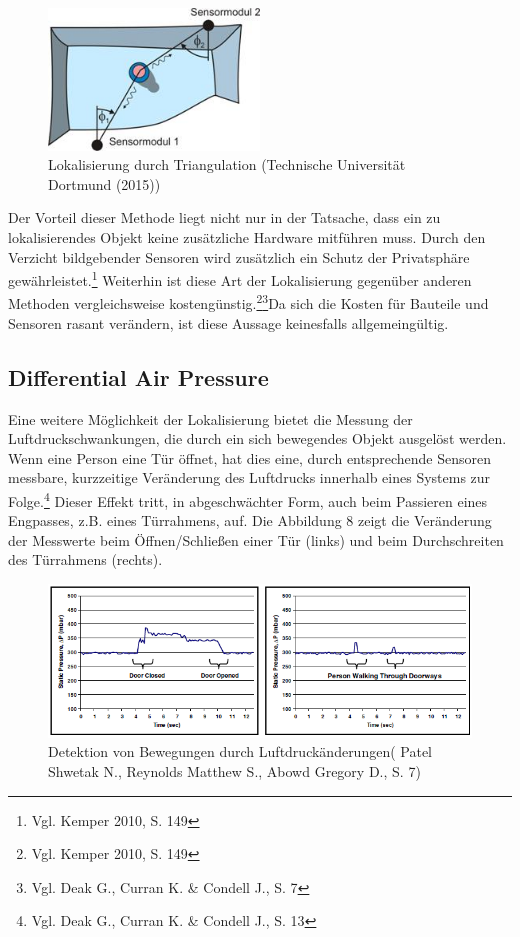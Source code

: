 \begin{figure}[H]
	\centering
	\includegraphics[width=0.5\textwidth]{pictures/triangulation}
	\caption{Lokalisierung durch Triangulation (Technische Universität Dortmund (2015))}
\end{figure}

Der Vorteil dieser Methode liegt nicht nur in der Tatsache, dass ein zu lokalisierendes Objekt keine zusätzliche Hardware mitführen muss. Durch den Verzicht bildgebender Sensoren wird zusätzlich ein Schutz der Privatsphäre gewährleistet.\footnote{Vgl. Kemper 2010, S. 149} Weiterhin ist diese Art der Lokalisierung gegenüber anderen Methoden vergleichsweise kostengünstig.\footnote{Vgl. Kemper 2010, S. 149}\footnote{Vgl. Deak G., Curran K. \& Condell J., S. 7}Da sich die Kosten für Bauteile und Sensoren rasant verändern, ist diese Aussage keinesfalls allgemeingültig. 

\subsection{Differential Air Pressure}
Eine weitere Möglichkeit der Lokalisierung bietet die Messung der Luftdruckschwankungen, die durch ein sich bewegendes Objekt ausgelöst werden. Wenn eine Person eine Tür öffnet, hat dies eine, durch entsprechende Sensoren messbare, kurzzeitige Veränderung des Luftdrucks innerhalb eines Systems zur Folge.\footnote{Vgl. Deak G., Curran K. \& Condell J., S. 13} Dieser Effekt tritt, in abgeschwächter Form, auch beim Passieren eines Engpasses, z.B. eines Türrahmens, auf. Die Abbildung 8 zeigt die Veränderung der Messwerte beim Öffnen/Schließen einer Tür (links) und beim Durchschreiten des Türrahmens (rechts).

\begin{figure}[H]
	\centering
	\includegraphics[width=1.0\textwidth]{pictures/dap_diagramm}
	\caption{Detektion von Bewegungen durch Luftdruckänderungen( Patel Shwetak N., Reynolds Matthew S., Abowd Gregory D., S. 7)}
\end{figure} 

